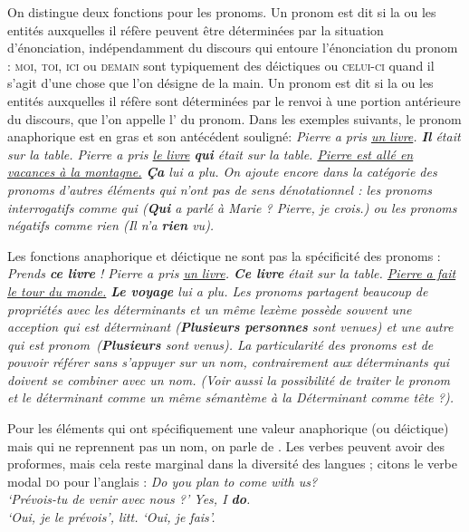 {    On distingue deux fonctions pour les pronoms. Un pronom est dit  si la ou les entités auxquelles il réfère peuvent être déterminées par la situation d’énonciation, indépendamment du discours qui entoure l’énonciation du pronom : \textsc{moi,} \textsc{toi,} \textsc{ici} ou \textsc{demain} sont typiquement des déictiques ou \textsc{celui-ci} quand il s’agit d’une chose que l’on désigne de la main. Un pronom est dit  si la ou les entités auxquelles il réfère sont déterminées par le renvoi à une portion antérieure du discours, que l’on appelle l’\textstyleTermes{} du pronom. Dans les exemples suivants, le pronom anaphorique est en gras et son antécédent souligné:
\ea
  \ea \itshape Pierre a pris \uline{un livre}. \textbf{Il}  était sur la table.
  \ex \itshape Pierre a pris \uline{le livre} \textbf{qui}  était sur la table.
  \ex \itshape \uline{Pierre est allé en vacances à la montagne.} \textbf{Ça} lui a plu.
  \z
\z
    On ajoute encore dans la catégorie des pronoms d’autres éléments qui n’ont pas de sens dénotationnel : les pronoms interrogatifs comme \textit{qui} (\textbf{\textit{Qui}} \textit{a parlé à Marie} ? \textit{Pierre, je crois.)} ou les pronoms négatifs comme \textit{rien} (\textit{Il n’a} \textbf{\textit{rien}} \textit{vu}).\textbf{ }

    Les fonctions anaphorique et déictique ne sont pas la spécificité des pronoms :
\ea
  \ea \itshape Prends \textbf{ce livre} !
  \ex \itshape Pierre a pris \uline{un livre}. \textbf{Ce livre}  était sur la table.
  \ex \itshape \uline{Pierre a fait le tour du monde.} \textbf{Le voyage}  lui a plu.
  \z
\z
    Les pronoms partagent beaucoup de propriétés avec les déterminants et un même lexème possède souvent une acception qui est déterminant (\textbf{\textit{Plusieurs personnes}} \textit{sont venues}) et une autre qui est pronom~(\textbf{\textit{Plusieurs}} \textit{sont venus}). La particularité des pronoms est de pouvoir référer sans s’appuyer sur un nom, contrairement aux déterminants qui doivent se combiner avec un nom. (Voir aussi la possibilité de traiter le pronom et le déterminant comme un même sémantème à la  \textit{Déterminant comme tête} ?).

    Pour les éléments qui ont spécifiquement une valeur anaphorique (ou déictique) mais qui ne reprennent pas un nom, on parle de . Les verbes peuvent avoir des proformes, mais cela reste marginal dans la diversité des langues ; citons le verbe modal \textsc{do} pour l’anglais :
\ea 
  \ea \itshape Do you plan to come with us?\\
  \glt   ‘Prévois-tu de venir avec nous ?’
  \ex \itshape Yes, I \textbf{do}.\\
  \glt   ‘Oui, je le prévois’, litt. ‘Oui, je fais’.
  \z
\z
}

